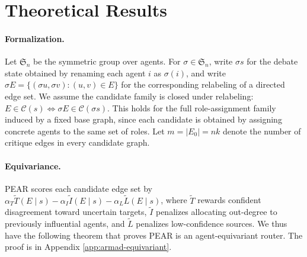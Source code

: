 \section{Theoretical Results}
\label{sec:theory}



\paragraph{Formalization.}

Let $\mathfrak S_n$ be the symmetric group over agents. For
$\sigma\in\mathfrak S_n$, write $\sigma s$ for the debate state obtained by
renaming each agent $i$ as $\sigma(i)$, and write
\(
    \sigma E = \{(\sigma u,\sigma v):(u,v)\in E\}
\)
for the corresponding relabeling of a directed edge set. We assume the candidate
family is closed under relabeling:
\(
    E\in\mathcal C(s)
    \Longleftrightarrow
    \sigma E\in\mathcal C(\sigma s)
\).
This holds for the full role-assignment family induced by a fixed base graph,
since each candidate is obtained by assigning concrete agents to the same set of
roles. Let $m=|E_0|=nk$ denote the number of critique edges in every candidate
graph.

\paragraph{Equivariance.}
PEAR scores each candidate edge set by
\(
    \alpha_T\widetilde T(E\mid s)
    -
    \alpha_I\widetilde I(E\mid s)
    -
    \alpha_L\widetilde L(E\mid s)\),
where $\widetilde T$ rewards confident disagreement toward uncertain targets,
$\widetilde I$ penalizes allocating out-degree to previously influential agents,
and $\widetilde L$ penalizes low-confidence sources. We thus have the following theorem that proves PEAR is an agent-equivariant router. The proof is in Appendix \ref{app:armad-equivariant}. %

